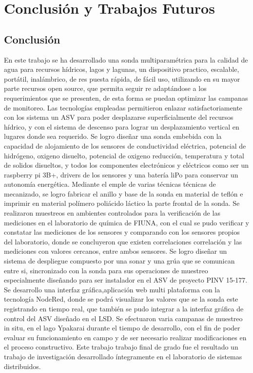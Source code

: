 \chapter[Conclusi\'on y Trabajos Futuros]{ Conclusión y Trabajos Futuros}
\pagestyle{fancy}

\section{Conclusi\'on}
En este trabajo se ha desarrollado una sonda multiparamétrica para la calidad de agua para recursos hídricos, lagos y lagunas, un dispositivo practico, escalable, portátil, inalámbrico, de res puesta rápida, de fácil uso, utilizando en su mayor parte recursos open source, que permita seguir re adaptándose a los requerimientos que se presenten, de esta forma se puedan optimizar las campanas de monitoreo. 
Las tecnologías empleadas permitieron enlazar satisfactoriamente con los sistema un ASV para poder desplazarse superficialmente del recursos hídrico, y con el sistema de descenso para lograr un desplazamiento vertical en lugares donde sea requerido. 
Se logro dise\~nar una sonda embebida con la capacidad de alojamiento de los sensores de conductividad el\'ectrica, potencial de hidr\'ogeno, oxigeno disuelto, potencial de oxigeno reducci\'on, temperatura  y total de solidos disueltos, y todos los componentes electrónicos y eléctricos como ser un raspberry pi 3B+, drivers de los sensores y una batería liPo para conservar un autonomía energética.
Mediante el emple de varias técnicas t\'ecnicas de mecanizado, se logro fabricar el anillo y base de la sonda en material de tefl\'on e imprimir en material polímero poliácido láctico la parte frontal de la sonda.
Se realizaron muestreos en ambientes controlados para la verificación de las mediciones en el laboratorio de química de FIUNA, con el cual se pudo verificar y constatar las mediciones de los sensores y comparando con los sensores propios del laboratorio, donde se concluyeron que existen correlaciones correlación y las mediciones con valores cercanos, entre ambos sensores.
Se logro diseñar un sistema de despliegue compuesto por una sonar y una grúa que se comunican entre si, sincronizado con la sonda para sus operaciones de muestreo especialmente diseñando para ser instalador en el ASV de proyecto PINV 15-177. 
Se desarrollo una interfaz gráfica,aplicación web multi plataforma con la tecnología NodeRed, donde se podrá visualizar los valores que se la sonda este registrando en tiempo real, que también se pudo integrar a la interfaz gráfica de control del ASV diseñado en el LSD.
Se efectuaron varia campanas de muestreo in situ, en el lago Ypakarai durante el tiempo de desarrollo, con el fin de poder evaluar su funcionamiento en campo y de ser necesario realizar modificaciones en el proceso constructivo.
Este trabajo trabajo final de grado fue el resultado un trabajo de investigación desarrollado íntegramente en el laboratorio de sistemas distribuidos. 

